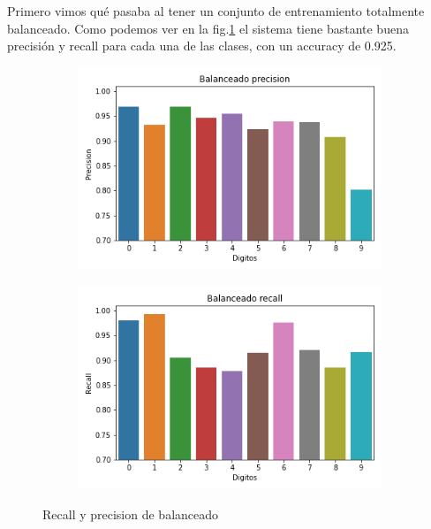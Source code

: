 Primero vimos qué pasaba al tener un conjunto de entrenamiento totalmente balanceado. Como podemos ver en la fig.\ref{fig:bal_recall_prec} el sistema tiene bastante buena precisión y recall para cada una de las clases, con un accuracy de 0.925.
\begin{figure}[h]
    \centering
    \begin{subfigure}{.5\textwidth}
        \centering
        \includegraphics[width=.8\linewidth]{images/balanceo/Balanceado precision_3795.png}
    \end{subfigure}%
    \begin{subfigure}{.5\textwidth}
        \centering
        \includegraphics[width=.8\linewidth]{images/balanceo/Balanceado recall_3795.png}
    \end{subfigure}%
    \caption{Recall y precision de balanceado}
    \label{fig:bal_recall_prec}
\end{figure}

